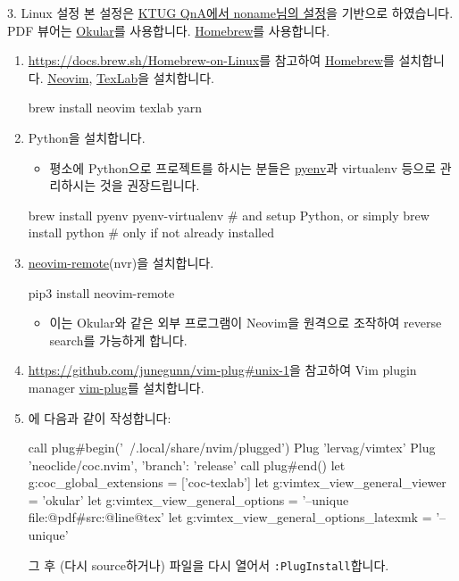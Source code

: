 \documentclass{beamer}
\begin{document}
\begin{frame}{3. Linux 설정}
  본 설정은
  \href{http://www.ktug.org/xe/index.php?document_srl=241426&mid=KTUG_QnA_board}{KTUG QnA에서 noname님의 설정}을 기반으로 하였습니다.
  PDF 뷰어는
  \href{http://www.ktug.org/xe/index.php?document_srl=241426&mid=KTUG_QnA_board}{Okular}를
  사용합니다.
  \href{https://brew.sh/}{Homebrew}를 사용합니다.
  \begin{enumerate}
    \item \url{https://docs.brew.sh/Homebrew-on-Linux}를 참고하여 \href{https://brew.sh/}{Homebrew}를 설치합니다.
      \href{https://neovim.io/}{Neovim},
      \href{https://texlab.netlify.com/}{TexLab}을 설치합니다.
      \begin{shellcode}
        brew install neovim texlab yarn
      \end{shellcode}

    \item Python을 설치합니다.
      \begin{itemize}
        \item 평소에 Python으로 프로젝트를 하시는 분들은
          \href{https://github.com/pyenv/pyenv#homebrew-on-macos}{pyenv}과
          virtualenv 등으로 관리하시는 것을 권장드립니다.
      \end{itemize}
      \begin{shellcode}
        brew install pyenv pyenv-virtualenv  # and setup Python, or simply
        brew install python  # only if not already installed
      \end{shellcode}

    \item \href{https://github.com/mhinz/neovim-remote}{neovim-remote}(nvr)을 설치합니다.
      \begin{shellcode}
        pip3 install neovim-remote
      \end{shellcode}
      \begin{itemize}
        \item 이는 Okular와 같은 외부 프로그램이 Neovim을 원격으로 조작하여
          reverse search를 가능하게 합니다.
      \end{itemize}

    \item \url{https://github.com/junegunn/vim-plug#unix-1}을 참고하여 Vim
      plugin manager \href{https://github.com/junegunn/vim-plug}{vim-plug}를
      설치합니다.
    \item {}에 다음과 같이 작성합니다:
      \begin{vimcode}
        call plug#begin('~/.local/share/nvim/plugged')
        Plug 'lervag/vimtex'
        Plug 'neoclide/coc.nvim', {'branch': 'release'}
        call plug#end()
        let g:coc_global_extensions = ['coc-texlab']
        let g:vimtex_view_general_viewer = 'okular'
        let g:vimtex_view_general_options = '--unique file:@pdf\#src:@line@tex'
        let g:vimtex_view_general_options_latexmk = '--unique'
      \end{vimcode}
      그 후 (다시 source하거나) 파일을 다시 열어서 \verb/:PlugInstall/합니다.


\end{enumerate}
\end{frame}
\end{document}
